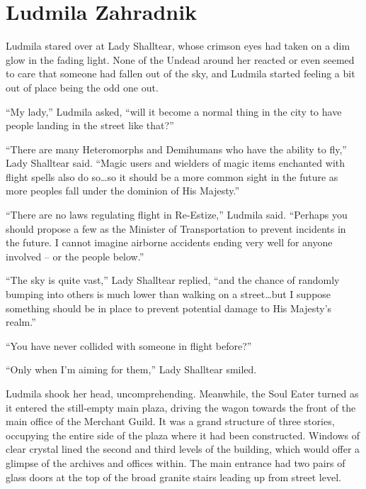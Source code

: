 \chapter{Ludmila Zahradnik}

Ludmila stared over at Lady Shalltear, whose crimson eyes had taken on a dim glow in the fading light. None of the Undead around her reacted or even seemed to care that someone had fallen out of the sky, and Ludmila started feeling a bit out of place being the odd one out.

 

“My lady,” Ludmila asked, “will it become a normal thing in the city to have people landing in the street like that?”

 

“There are many Heteromorphs and Demihumans who have the ability to fly,” Lady Shalltear said. “Magic users and wielders of magic items enchanted with flight spells also do so…so it should be a more common sight in the future as more peoples fall under the dominion of His Majesty.”

 

“There are no laws regulating flight in Re-Estize,” Ludmila said. “Perhaps you should propose a few as the Minister of Transportation to prevent incidents in the future. I cannot imagine airborne accidents ending very well for anyone involved – or the people below.”

 

“The sky is quite vast,” Lady Shalltear replied, “and the chance of randomly bumping into others is much lower than walking on a street…but I suppose something should be in place to prevent potential damage to His Majesty’s realm.”

 

“You have never collided with someone in flight before?”

 

“Only when I’m aiming for them,” Lady Shalltear smiled.

 

Ludmila shook her head, uncomprehending. Meanwhile, the Soul Eater turned as it entered the still-empty main plaza, driving the wagon towards the front of the main office of the Merchant Guild. It was a grand structure of three stories, occupying the entire side of the plaza where it had been constructed. Windows of clear crystal lined the second and third levels of the building, which would offer a glimpse of the archives and offices within. The main entrance had two pairs of glass doors at the top of the broad granite stairs leading up from street level.

